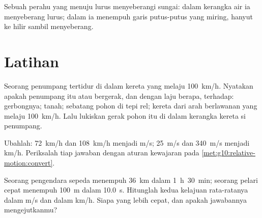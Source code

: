 \begin{omfigure}

{\small Sebuah perahu yang menuju lurus menyeberangi sungai: dalam
kerangka air ia menyeberang lurus; dalam  ia menempuh
garis putus-putus yang miring, hanyut ke hilir sambil menyeberang.}
\end{omfigure}

\section{Latihan}

\begin{exercise}[$\star$]\label{exo:g10:relative-motion:1}
Seorang penumpang tertidur di dalam kereta yang melaju \qty{100}{km/h}.
Nyatakan apakah penumpang itu  atau bergerak, dan dengan laju
berapa, terhadap: gerbongnya; tanah; sebatang pohon di tepi rel; kereta
dari arah berlawanan yang melaju \qty{100}{km/h}. Lalu lukiskan gerak
pohon itu di dalam kerangka kereta si penumpang.
\end{exercise}

\begin{exercise}[$\star$]\label{exo:g10:relative-motion:2}
Ubahlah: \qty{72}{km/h} dan \qty{108}{km/h} menjadi \unit{m/s};
\qty{25}{m/s} dan \qty{340}{m/s} menjadi \unit{km/h}. Periksalah tiap
jawaban dengan aturan kewajaran pada
\cref{met:g10:relative-motion:convert}.
\end{exercise}

\begin{exercise}[$\star$]\label{exo:g10:relative-motion:3}
Seorang pengendara sepeda menempuh \qty{36}{km} dalam
\qty{1}{h}~\qty{30}{min}; seorang pelari cepat menempuh \qty{100}{m}
dalam \qty{10.0}{s}. Hitunglah kedua kelajuan rata-ratanya dalam
\unit{m/s} dan dalam \unit{km/h}. Siapa yang lebih cepat, dan apakah
jawabannya mengejutkanmu?
\end{exercise}

